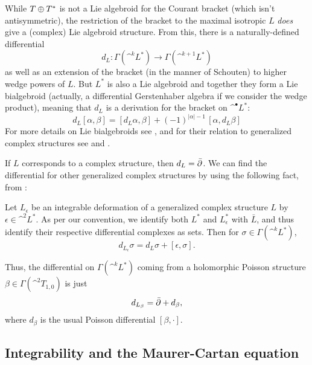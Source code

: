 \documentclass{article}
\begin{document}
While $T\oplus T^*$ is not a Lie algebroid for the Courant bracket (which isn't antisymmetric), the restriction of the bracket to the maximal isotropic $L$ \emph{does} give a (complex) Lie algebroid structure.  From this, there is a naturally-defined differential
$$d_L : \Gamma(\^ ^k L^*) \to \Gamma(\^ ^{k+1} L^*)$$
as well as an extension of the bracket (in the manner of Schouten) to higher wedge powers of $L$.  But $L^*$ is also a Lie algebroid and together they form a Lie bialgebroid (actually, a differential Gerstenhaber algebra if we consider the wedge product), meaning that $d_L$ is a derivation for the bracket on $\^ ^\bullet L^*$:
\begin{equation}\label{bialgebroid}
d_L[\alpha,\beta] = [d_L\alpha,\beta] + (-1)^{|\alpha|-1}\, [\alpha,d_L\beta]
\end{equation}
For more details on Lie bialgebroids see \cite{LiuWeinsteinXu}, and for their relation to generalized complex structures see \cite{GrandiniPoonRolle} and \cite{Gualtieri2011}.

\begin{example}
If $L$ corresponds to a complex structure, then $d_L = \bar{\partial}$.  We can find the differential for other generalized complex structures by using the following fact, from \cite{GrandiniPoonRolle}:
\end{example}

\begin{prop}\label{deformation of d_L}
Let $L_\epsilon$ be an integrable deformation of a generalized complex structure $L$ by $\epsilon \in \^ ^2 L^*$.  As per our convention, we identify both $L^*$ and $L_\epsilon^*$ with $\bar{L}$, and thus identify their respective differential complexes as sets.  Then for $\sigma \in \Gamma(\^ ^k L^*)$,
$$d_{L_\epsilon} \sigma = d_L \sigma + [\epsilon, \sigma].$$
\end{prop}

\begin{example}\label{d_L for Poisson}
Thus, the differential on $\Gamma(\^ ^k L^*)$ coming from a holomorphic Poisson structure $\beta \in \Gamma(\^ ^2 T_{1,0})$ is just
$$d_{L_\beta} = \bar{\partial} + d_\beta,$$
where $d_\beta$ is the usual Poisson differential $[\beta,\cdot]$.
\end{example}


\subsection{Integrability and the Maurer-Cartan equation}\label{Maurer-Cartan section}
\end{document}
